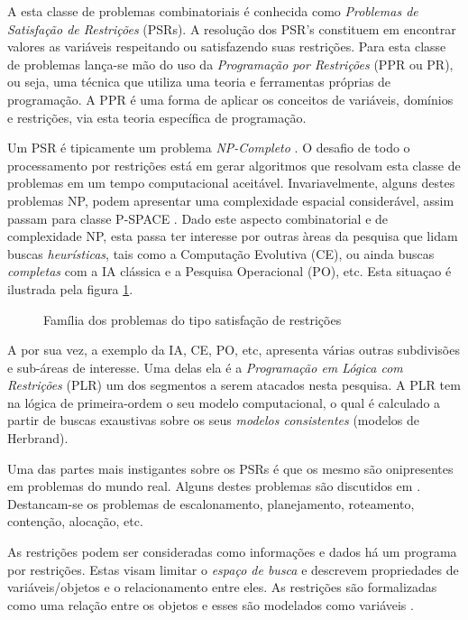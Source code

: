 A esta classe de problemas combinatoriais é conhecida como \textit{Problemas de Satisfação de Restrições} (PSRs). A resoluç\~ao dos PSR's constituem em encontrar valores as variáveis
respeitando ou satisfazendo suas restrições. Para esta classe de problemas lança-se mão do uso da \textit{Programação por Restrições} (PPR ou PR), ou seja, uma técnica que utiliza uma teoria e  ferramentas pr\'oprias de  programação. A PPR é uma forma de aplicar os conceitos de variáveis, domínios e restrições, via esta teoria específica de programação. 

Um PSR é tipicamente um problema \textit{NP-Completo} \cite{rossi_2006}. O desafio de todo o processamento por restrições está em gerar algoritmos que resolvam esta classe de problemas em um tempo
computacional aceitável. Invariavelmente, alguns destes problemas NP, podem apresentar uma
complexidade espacial consider\'avel, assim passam para classe P-SPACE \cite{sipser12}.
Dado este aspecto combinatorial e de complexidade NP, esta passa ter interesse
por outras àreas da pesquisa que lidam buscas \textit{heurísticas}, tais como a Computação Evolutiva (CE),
 ou ainda buscas \textit{completas} com a IA clássica e a Pesquisa Operacional (PO), etc. Esta situaçao é ilustrada pela figura \ref{fig:eureka}.


\begin{figure}[!ht]
\begin{center}
  \caption{Família dos problemas do tipo satisfação de restrições}
\label{fig:eureka}
\end{center}
\end{figure}


A \PR por sua vez, a exemplo da IA, CE, PO, etc, apresenta várias outras
subdivisões e sub-áreas de interesse.  Uma delas ela é a \textit{Programação em Lógica com Restrições} (PLR) um dos segmentos a serem atacados nesta pesquisa. A PLR tem na lógica de primeira-ordem 
o seu modelo computacional, o qual é calculado a partir de buscas exaustivas sobre
os seus \textit{modelos consistentes} (modelos de Herbrand).

Uma das   partes mais instigantes sobre os PSRs é que os mesmo são onipresentes
em problemas do mundo real. Alguns destes  problemas são discutidos em \cite{rossi_2006}.
Destancam-se os problemas de escalonamento, planejamento, roteamento, contenção,
alocação, etc.

As restrições podem ser consideradas como informações e dados há um programa por restrições. 
Estas  visam limitar o \textit{espaço de busca} e descrevem propriedades de 
variáveis/objetos e o relacionamento entre eles. As restrições são formalizadas como uma relação entre os objetos e esses são modelados como variáveis \cite{fruewirth2003}.

